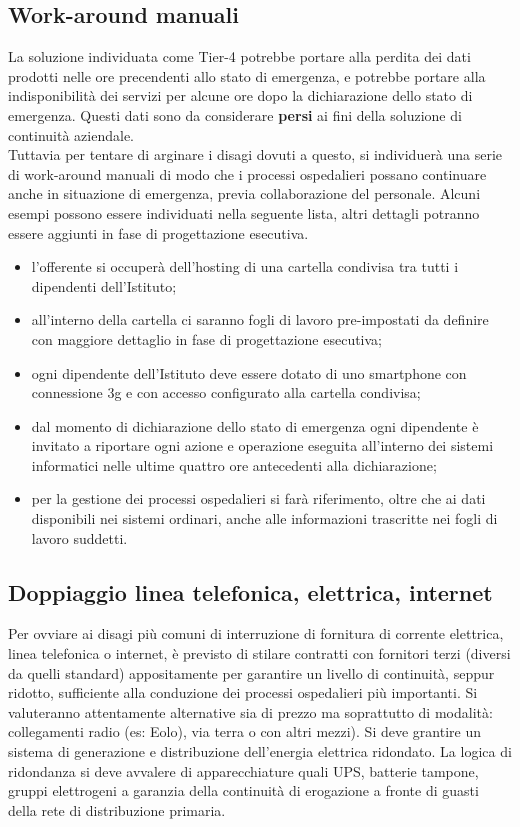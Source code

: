 \subsection{Work-around manuali}
\label{workaround}
La soluzione individuata come Tier-4 potrebbe portare alla perdita dei dati prodotti nelle ore precendenti allo stato di emergenza, e potrebbe portare alla indisponibilità dei servizi per alcune ore dopo la dichiarazione dello stato di emergenza. Questi dati sono da considerare \textbf{persi} ai fini della soluzione di continuità aziendale. \\ Tuttavia per tentare di arginare i disagi dovuti a questo, si individuerà una serie di work-around manuali di modo che i processi ospedalieri possano continuare anche in situazione di emergenza, previa collaborazione del personale. Alcuni esempi possono essere individuati nella seguente lista, altri dettagli potranno essere aggiunti in fase di progettazione esecutiva.
\begin{itemize}
\item l'offerente si occuperà dell'hosting di una cartella condivisa tra tutti i dipendenti dell'Istituto;
\item all'interno della cartella ci saranno fogli di lavoro pre-impostati da definire con maggiore dettaglio in fase di progettazione esecutiva;
\item ogni dipendente dell'Istituto deve essere dotato di uno smartphone con connessione 3g e con accesso configurato alla cartella condivisa;
\item dal momento di dichiarazione dello stato di emergenza ogni dipendente è invitato a riportare ogni azione e operazione eseguita all'interno dei sistemi informatici nelle ultime quattro ore antecedenti alla dichiarazione;
\item per la gestione dei processi ospedalieri si farà riferimento, oltre che ai dati disponibili nei sistemi ordinari, anche alle informazioni trascritte nei fogli di lavoro suddetti.
\end{itemize}

\subsection{Doppiaggio linea telefonica, elettrica, internet}
Per ovviare ai disagi più comuni di interruzione di fornitura di corrente elettrica, linea telefonica o internet, è previsto di stilare contratti con fornitori terzi (diversi da quelli standard) appositamente per garantire un livello di continuità, seppur ridotto, sufficiente alla conduzione dei processi ospedalieri più importanti.
Si valuteranno attentamente alternative sia di prezzo ma soprattutto di modalità: collegamenti radio (es: Eolo), via terra o con altri mezzi). Si deve grantire un sistema di generazione e distribuzione dell’energia elettrica ridondato. La logica  di  ridondanza  si  deve  avvalere  di  apparecchiature  quali  UPS,  batterie  tampone,  gruppi elettrogeni  a  garanzia  della  continuità  di  erogazione  a  fronte  di  guasti  della  rete  di  distribuzione primaria. 

